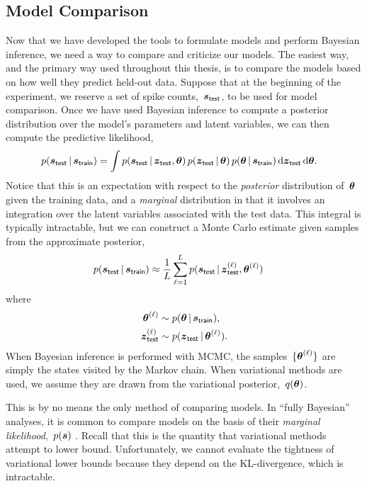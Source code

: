 \subsection{Model Comparison}
Now that we have developed the tools to formulate models and perform
Bayesian inference, we need a way to compare and criticize our models.
The easiest way, and the primary way used throughout this thesis, is
to compare the models based on how well they predict 
held-out data. Suppose that at the beginning of the experiment, we reserve
a set of spike counts,~$\boldsymbol{s}_{\mathsf{test}}$, to be used for model
comparison. Once we have used Bayesian inference to compute a
posterior distribution over the model's parameters and latent variables,
we can then compute the predictive likelihood,
\begin{align}
  \label{eq:predictive_likelihood}
  p(\boldsymbol{s}_{\mathsf{test}} \,|\, \boldsymbol{s}_{\mathsf{train}})
  &= \int p(\boldsymbol{s}_{\mathsf{test}} \,|\, \boldsymbol{z}_{\mathsf{test}}, \boldsymbol{\theta}) \,
  p(\boldsymbol{z}_{\mathsf{test}} \,|\, \boldsymbol{\theta}) \,
  p(\boldsymbol{\theta} \,|\, \boldsymbol{s}_{\mathsf{train}}) \,
  \mathrm{d}\boldsymbol{z}_{\mathsf{test}} \, \mathrm{d} \boldsymbol{\theta}.
\end{align}
Notice that this is an expectation with respect to the \emph{posterior}
distribution of~$\boldsymbol{\theta}$ given the training data, and a \emph{marginal}
distribution in that it involves an integration over the latent variables
associated with the test data. This integral is typically
intractable, but we can construct a Monte Carlo estimate given 
samples from the approximate posterior,
\begin{align*}
  p(\boldsymbol{s}_{\mathsf{test}} \,|\, \boldsymbol{s}_{\mathsf{train}})
  &\approx \frac{1}{L} \sum_{\ell=1}^L
  p(\boldsymbol{s}_{\mathsf{test}} \,|\, \boldsymbol{z}_{\mathsf{test}}^{(\ell)}, \boldsymbol{\theta}^{(\ell)}) \,
\end{align*}
where
\begin{align*}
  \boldsymbol{\theta}^{(\ell)} &\sim p(\boldsymbol{\theta} \,|\, \boldsymbol{s}_{\mathsf{train}}), \\
  \boldsymbol{z}_{\mathsf{test}}^{(\ell)} &\sim   p(\boldsymbol{z}_{\mathsf{test}} \,|\, \boldsymbol{\theta}^{(\ell)}).
\end{align*}
When Bayesian inference is performed with MCMC, the samples~$\{\boldsymbol{\theta}^{(\ell)}\}$
are simply the states visited by the Markov chain. When variational methods
are used, we assume they are drawn from the  variational posterior,~$q(\boldsymbol{\theta})$.

This is by no means the only method of comparing models. In ``fully
Bayesian'' analyses, it is common to compare models on the basis of
their \emph{marginal likelihood},~$p(\boldsymbol{s})$ \citep{kass1995bayes}. Recall that this is the
quantity that variational methods attempt to lower bound. Unfortunately,
we cannot evaluate the tightness of variational lower bounds because
they depend on the KL-divergence, which is intractable.

